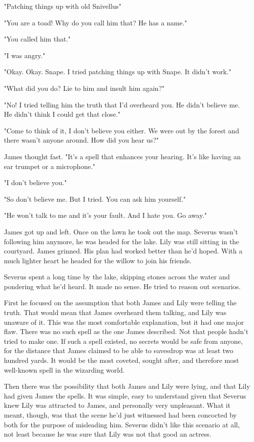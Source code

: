 "Patching things up with old Snivellus{\el}"

"You are a toad! Why do you call him that? He has a name."

"You called him that."

"I was angry."

"Okay. Okay. Snape. I tried patching things up with Snape. It didn't work."

"What did you do? Lie to him and insult him again?"

"No! I tried telling him the truth{\el} that I'd overheard you. He didn't believe me. He didn't think I could get that close."

"Come to think of it, I don't believe you either. We were out by the forest and there wasn't anyone around. How did you hear us?"

James thought fast. "It's a spell that enhances your hearing. It's like having an ear trumpet or a microphone."

"I don't believe you."

"So don't believe me. But I tried. You can ask him yourself."

"He won't talk to me and it's your fault. And I hate you. Go away."

James got up and left. Once on the lawn he took out the map. Severus wasn't following him anymore, he was headed for the lake. Lily was still sitting in the courtyard. James grinned. His plan had worked better than he'd hoped. With a much lighter heart he headed for the willow to join his friends.

Severus spent a long time by the lake, skipping stones across the water and pondering what he'd heard. It made no sense. He tried to reason out scenarios.

First he focused on the assumption that both James and Lily were telling the truth. That would mean that James overheard them talking, and Lily was unaware of it. This was the most comfortable explanation, but it had one major flaw. There was no such spell as the one James described. Not that people hadn't tried to make one. If such a spell existed, no secrets would be safe from anyone, for the distance that James claimed to be able to eavesdrop was at least two hundred yards. It would be the most coveted, sought after, and therefore most well-known spell in the wizarding world.

Then there was the possibility that both James and Lily were lying, and that Lily had given James the spells. It was simple, easy to understand given that Severus knew Lily was attracted to James, and personally very unpleasant. What it meant, though, was that the scene he'd just witnessed had been concocted by both for the purpose of misleading him. Severus didn't like this scenario at all, not least because he was sure that Lily was not that good an actress.

